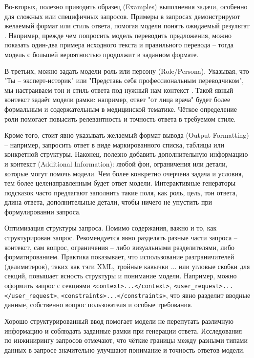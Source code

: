 Во-вторых, полезно приводить образец (Examples) выполнения задачи, особенно для сложных или специфичных запросов. Примеры в запросах демонстрируют желаемый формат или стиль ответа, помогая модели понять ожидаемый результат \cite{learnprompt:promptstructure}. Например, прежде чем попросить модель переводить предложения, можно показать один-два примера исходного текста и правильного перевода – тогда модель с большей вероятностью продолжит в заданном формате\cite{learnprompt:promptstructure}.

В-третьих, можно задать модели роль или персону (Role/Persona). Указывая, что "Ты – эксперт-историк" или "Представь себя профессиональным переводчиком", мы настраиваем тон и стиль ответа под нужный нам контекст \cite{learnprompt:promptstructure}. Такой явный контекст задаёт модели рамки: например, ответ "от лица врача" будет более формальным и содержательным в медицинской тематике. Чёткое определение роли помогает повысить релевантность и точность ответа в требуемом стиле.

Кроме того, стоит явно указывать желаемый формат вывода (Output Formatting) – например, запросить ответ в виде маркированного списка, таблицы или конкретной структуры. Наконец, полезно добавить дополнительную информацию и контекст (Additional Information): любой фон, ограничения или детали, которые могут помочь модели. Чем более конкретно очерчена задача и условия, тем более целенаправленным будет ответ модели. Интерактивные генераторы подсказок часто предлагают заполнить такие поля, как роль, цель, тон ответа, длина ответа, дополнительные детали, чтобы ничего не упустить при формулировании запроса\cite{copilotworks:promptgen}. 

Оптимизация структуры запроса. Помимо содержания, важно и то, как структурирован запрос. Рекомендуется явно разделять разные части запроса – контекст, сам вопрос, ограничения – либо визуальными разделителями, либо форматированием. Практика показывает, что использование разграничителей (делимитеров), таких как тэги XML, тройные кавычки \( \dots \) или угловые скобки для секций, повышает ясность структуры и понимание модели\cite{lakera:2025}. Например, можно оформить запрос с секциями \texttt{\verb|<context>...</context>|}, \texttt{<user\_request>...</user\_request>}, \texttt{<constraints>...</constraints>}, что явно разделит вводные данные, собственно вопрос пользователя и особые требования\cite{lakera:2025}.

Хорошо структурированный ввод помогает модели не перепутать различную информацию и соблюдать заданные рамки при генерации ответа. Исследования по инжинирингу запросов отмечают, что чёткие границы между разными типами данных в запросе значительно улучшают понимание и точность ответов модели\cite{lakera:2025}. 

